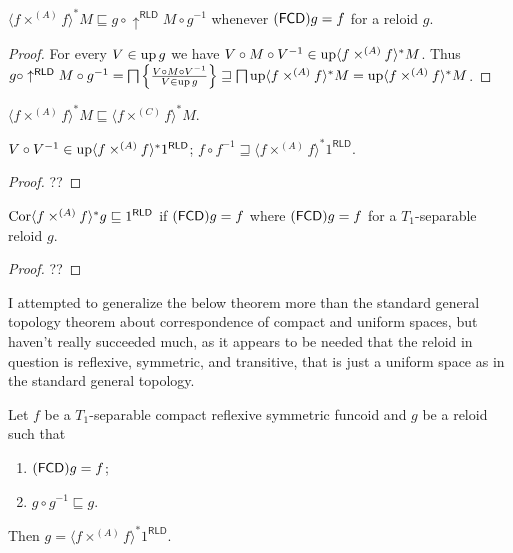 \begin{prop}\label{ffm}
  $\langle f \times^{(A)} f \rangle^{\ast} M \sqsubseteq g \circ
  \uparrow^{\mathsf{RLD}} M \circ g^{- 1}$ whenever
  $(\mathsf{FCD}) g = f$ for a reloid $g$.
\end{prop}

\begin{proof}
  For every $V \in \operatorname{up} g$ we have $V \circ M \circ V^{- 1} \in \operatorname{up}
  \langle f \times^{(A)} f \rangle^{\ast} M$. Thus $g \circ
  \uparrow^{\mathsf{RLD}} M \circ g^{- 1} = \bigsqcap \left\{ \frac{ V \circ M
  \circ V^{- 1} }{ V \in \operatorname{up} g }\right\}
  \sqsupseteq \bigsqcap \operatorname{up} \langle f \times^{(A)} f \rangle^{\ast} M =
  \operatorname{up} \langle f \times^{(A)} f \rangle^{\ast} M$.
\end{proof}

\begin{cor}
  $\langle f \times^{(A)} f \rangle^{\ast} M \sqsubseteq \langle f \times^{(C)} f
  \rangle^{\ast} M$.
\end{cor}

\begin{cor}
  $V \circ V^{- 1} \in \operatorname{up} \langle f \times^{(A)} f \rangle^{\ast} 1^{\mathsf{RLD}}$; $f
  \circ f^{- 1} \sqsupseteq \langle f \times^{(A)} f \rangle^{\ast} 1^{\mathsf{RLD}}$.
\end{cor}

\begin{proof}
  ??
\end{proof}

\begin{lem}
  $\operatorname{Cor} \langle f \times^{(A)} f \rangle^{\ast} g \sqsubseteq 1^{\mathsf{RLD}}$ if
  $(\mathsf{FCD}) g = f$ where $(\mathsf{FCD}) g = f$ for a
  $T_1$-separable reloid $g$.
\end{lem}

\begin{proof}
  ??
\end{proof}

\begin{rem}
  I attempted to generalize the below theorem more than the standard general
  topology theorem about correspondence of compact and uniform spaces, but
  haven't really succeeded much, as it appears to be needed that the reloid in
  question is reflexive, symmetric, and transitive, that is just a uniform
  space as in the standard general topology.
\end{rem}

\begin{thm}\label{cmp-main}
  Let $f$ be a $T_1$-separable compact 
  reflexive symmetric funcoid and $g$ be a reloid such that
  \begin{enumerate}
    \item $(\mathsf{FCD}) g = f$;
    
    \item $g \circ g^{- 1} \sqsubseteq g$.
  \end{enumerate}
  Then $g = \langle f \times^{(A)} f \rangle^{\ast} 1^{\mathsf{RLD}}$.
\end{thm}

